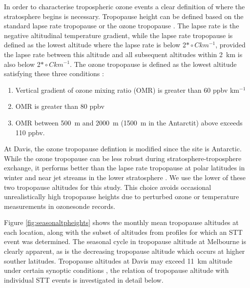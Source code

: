 \documentclass{article}
\begin{document}
    In order to characterise tropospheric ozone events a clear definition of where the stratosphere begins is necessary.
    Tropopause height can be defined based on the standard lapse rate tropopause \citep{WMO1957} or the ozone tropopause \citep{Bethan1996}.
    The lapse rate is the negative altitudinal temperature gradient, while the lapse rate tropopause is defined as the lowest altitude where the lapse rate is below 2$*\circ C km^{-1}$, provided the lapse rate between this altitude and all subsequent altitudes within 2~km is also below 2$*\circ C km^{-1}$.
    The ozone tropopause is defined as the lowest altitude satisfying these three conditions \citep{Bethan1996}:
    \begin{enumerate}
      \item Vertical gradient of ozone mixing ratio (OMR) is greater than 60 ppbv km$^{-1}$
      \item OMR is greater than 80 ppbv
      \item OMR between 500~m and 2000~m (1500~m in the Antarctit) above exceeds 110 ppbv.
    \end{enumerate}
    At Davis, the ozone tropopause defintion is modified since the site is Antarctic.
    While the ozone tropopause can be less robust during stratosphere-troposphere exchange, it performs better than the lapse rate tropopause at polar latitudes in winter and near jet streams in the lower stratosphere \citep{Bethan1996, Tomikawa2009, Alexander2013}. 
    We use the lower of these two tropopause altitudes for this study.
    This choice avoids occasional unrealistically high tropopause heights due to perturbed ozone or temperature measurements in ozonesonde records.
    
    Figure \ref{fig:seasonaltpheights} shows the monthly mean tropopause altitudes at each location, along with the subset of altitudes from profiles for which an STT event was determined. 
    The seasonal cycle in tropopause altitude at Melbourne is clearly apparent, as is the decreasing tropopause altitude which occurs at higher souther latitudes.
    Tropopause altitudes at Davis may exceed 11~km altitude under certain synoptic conditions \citep{Alexander2013}, the relation of tropopause altitude with individual STT events is investigated in detail below.
\end{document}
